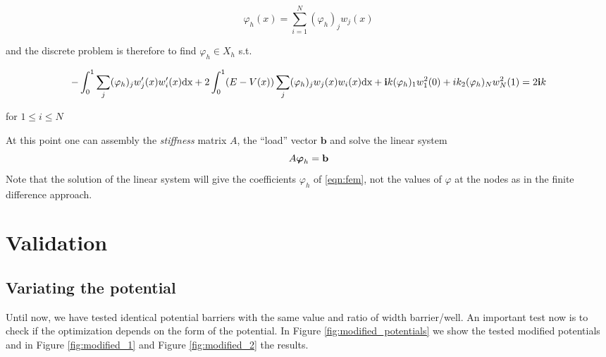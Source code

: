 \documentclass[12pt,a4paper,onecolumn]{article}
\theoremstyle{definition}
\theoremstyle{plain}
\newcommand{\var}{\varphi}
\begin{document}
\begin{equation}
\label{eqn:fem}
\var_h(x)=\sum_{i=1}^{N} (\var_h)_j w_j(x)
\end{equation}

and the discrete problem is therefore to find $\var_h \in X_h$ s.t.

\[
-\int_0^1  \sum_j (\var_h)_j w_j'(x) w_i'(x) \text{dx} + 2 \int_0^1 (E-V(x)) \sum_j (\var_h)_j w_j(x) w_i(x) \text{dx} + \bold{i}k (\var_h)_1 w_{1}^{2}(0) + i k_2 (\var_h)_N w_N^{2}(1)= 2 \bold{i} k
\]

for $1\leq i \leq N$ 




At this point one can assembly the \emph{stiffness} matrix $A$, the ``load'' vector $\boldsymbol{b}$ and solve the linear system \[
A \boldsymbol{\var}_h= \bold{b}\]
Note that the solution of the linear system will give the coefficients $\var_h$ of  \eqref{eqn:fem}, not the values of $\var$ at the nodes as in the finite difference approach.





















\section{Validation}
\subsection{Variating the potential}
Until now, we have tested identical potential barriers with the same value and ratio of width barrier/well. An important test now is to check if the optimization depends on the form of the potential. In Figure \ref {fig:modified_potentials} we show the tested modified potentials and in Figure \ref{fig:modified_1} and Figure \ref{fig:modified_2} the results.
\end{document}

